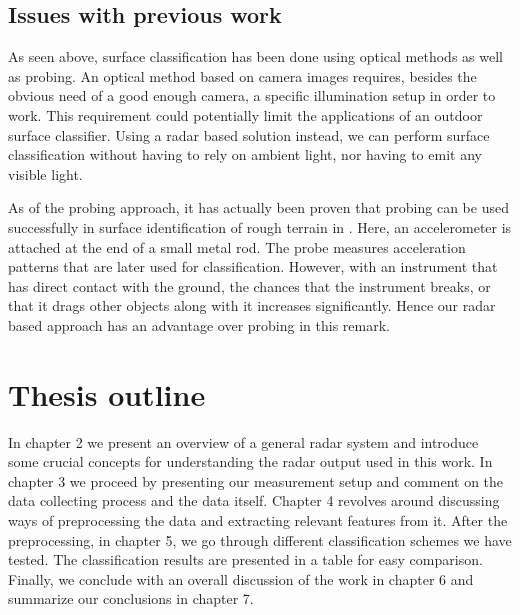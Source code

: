 \subsection{Issues with previous work}
As seen above, surface classification has been done using optical methods as well as probing. An optical method based on camera images requires, besides the obvious need of a good enough camera, a specific illumination setup in order to work. This requirement could potentially limit the applications of an outdoor surface classifier. Using a radar based solution instead, we can perform surface classification without having to rely on ambient light, nor having to emit any visible light.

As of the probing approach, it has actually been proven that probing can be used successfully in surface identification of rough terrain in \citep{giguere_dudek_2011}. Here, an accelerometer is attached at the end of a small metal rod. The probe measures acceleration patterns that are later used for classification. However, with an instrument that has direct contact with the ground, the chances that the instrument breaks, or that it drags other objects along with it increases significantly. Hence our radar based approach has an advantage over probing in this remark.

\section{Thesis outline}

In chapter 2 we present an overview of a general radar system and introduce some crucial concepts for understanding the radar output used in this work. In chapter 3 we proceed by presenting our measurement setup and comment on the data collecting process and the data itself. Chapter 4 revolves around discussing ways of preprocessing the data and extracting relevant features from it. After the preprocessing, in chapter 5, we go through different classification schemes we have tested. The classification results are presented in a table for easy comparison. Finally, we conclude with an overall discussion of the work in chapter 6 and summarize our conclusions in chapter 7.





